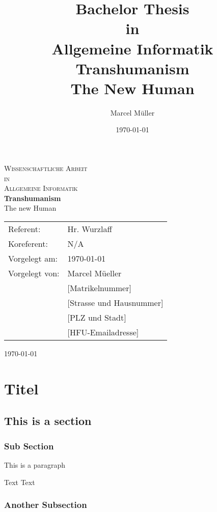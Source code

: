 \documentclass[
			12pt,
			a4paper,
			cleardoubleempty,
			final,
			twoside
				]{scrbook}
\title{\fontsize{14}{14}Bachelor Thesis \\ in \\Allgemeine Informatik
\fontsize{22}{22}\textbf{Transhumanism}\\
\fontsize{18}{18} The New Human}
\author{Marcel M\"uller}
\date{\today}
\begin{document}
\setcounter{secnumdepth}{3}


\begin{titlepage}
\begin{center}


\fontsize{18}{18}
\textsc{Wissenschaftliche Arbeit \\[0.5cm] in \\[0.5cm] Allgemeine Informatik}\\[1.5cm]

\fontsize{22}{22}
{ \bfseries Transhumanism \\[0.4cm] }
\fontsize{18}{18}
{ The new Human\\[10cm] }

\begin{tabular}{l l}
	 Referent:  & Hr. Wurzlaff \\
	 Koreferent: & N/A\\
	 Vorgelegt am: & \today\\ %
	 Vorgelegt von: & Marcel M\"ueller\\
	 & [Matrikelnummer] \\
	 & [Strasse und Hausnummer] \\
	 & [PLZ und Stadt] \\
	 & [HFU-Emailadresse]\\
\end{tabular}

\vfill

{\large \today}

\end{center}
\end{titlepage}

\frontmatter



\newpage
\tableofcontents




\cleardoubleemptypage

\newpage

\mainmatter
\chapter{Titel}
\section{This is a section}
\subsection{Sub Section}
\begin{par}
	This is a paragraph
\end{par}

\newpage

Text
Text

\newpage

\subsection{Another Subsection}

\backmatter

\end{document}
